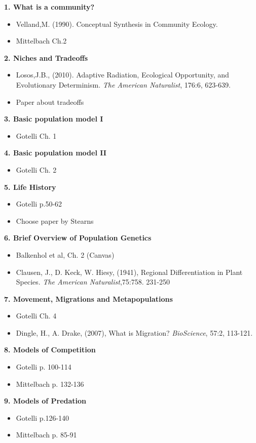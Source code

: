 \documentclass{article}
\begin{document}

\hline
\textbf{1. What is a community?}
\begin{itemize}
\item Velland,M. (1990). Conceptual Synthesis in Community Ecology.
\item Mittelbach Ch.2
\end{itemize}
\hline
\textbf{2. Niches and Tradeoffs}
\begin{itemize}
\item Losos,J.B., (2010). Adaptive Radiation, Ecological Opportunity, and Evolutionary Determinism. \textit{The American Naturalist}, 176:6, 623-639.
\item Paper about tradeoffs
\end{itemize}
\hline
\textbf{3. Basic population model I}
\begin{itemize}
\item Gotelli Ch. 1
\end{itemize}
\hline
\textbf{4. Basic population model II}
\begin{itemize}
\item Gotelli Ch. 2
\end{itemize}
\hline
\textbf{5. Life History}
\begin{itemize}
\item Gotelli p.50-62
\item Choose paper by Stearns
\end{itemize}
\hline
\textbf{6. Brief Overview of Population Genetics}
\begin{itemize}
\item Balkenhol et al, Ch. 2 (Canvas)
\item Clausen, J., D. Keck, W. Hiesy, (1941), Regional Differentiation in Plant Species. \textit{The American Naturalist},75:758. 231-250
\end{itemize}
\hline
\textbf{7. Movement, Migrations and Metapopulations}
\begin{itemize}
\item Gotelli Ch. 4
\item Dingle, H., A. Drake, (2007), What is Migration? \textit{BioScience}, 57:2, 113-121.
\end{itemize}
\hline
\textbf{8. Models of Competition}
\begin{itemize}
\item Gotelli p. 100-114
\item Mittelbach p. 132-136
\end{itemize}
\hline
\textbf{9. Models of Predation}
\begin{itemize}
\item Gotelli p.126-140
\item Mittelbach p. 85-91
\end{itemize}
\end{document}
